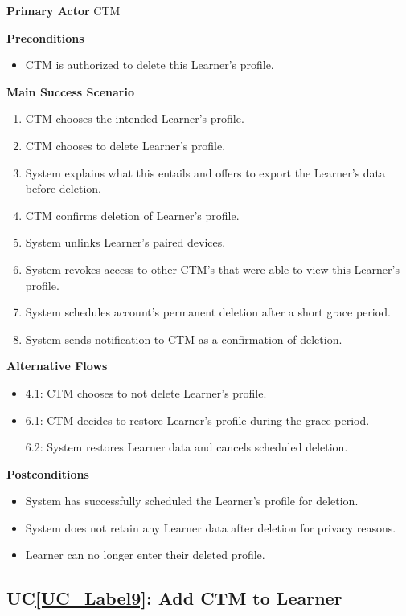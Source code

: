 \documentclass[12pt]{article}
\newcounter{ucnum} %
\newcommand{\ucref}[1]{UC\ref{#1}}
\begin{document}
\textbf{Primary Actor}
CTM

\textbf{Preconditions}
\begin{itemize}
\item CTM is authorized to delete this Learner's profile.
\end{itemize}

\textbf{Main Success Scenario}
\begin{enumerate}
\item CTM chooses the intended Learner's profile.
\item CTM chooses to delete Learner's profile.
\item System explains what this entails and offers to export the Learner's data before deletion.
\item CTM confirms deletion of Learner's profile.
\item System unlinks Learner's paired devices.
\item System revokes access to other CTM's that were able to view this Learner's profile.
\item System schedules account's permanent deletion after a short grace period.
\item System sends notification to CTM as a confirmation of deletion.
\end{enumerate}

\textbf{Alternative Flows}
\begin{itemize}
\item 4.1: CTM chooses to not delete Learner's profile.

\item 6.1: CTM decides to restore Learner's profile during the grace period.

6.2: System restores Learner data and cancels scheduled deletion.

\end{itemize}

\textbf{Postconditions}
\begin{itemize}
\item System has successfully scheduled the Learner's profile for deletion.
\item System does not retain any Learner data after deletion for privacy reasons.
\item Learner can no longer enter their deleted profile.
\end{itemize}

 \label{UC_Label9}
\subsection{\ucref{UC_Label9}: Add CTM to Learner}
\end{document}
